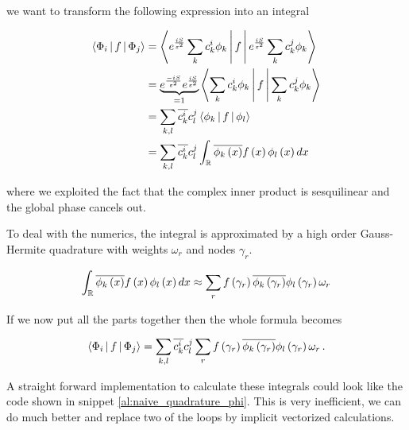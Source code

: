 we want to transform the following expression into an integral

\begin{equation} \label{eq:inner_product_single_family}
\begin{split}
  \Braket{ \Phi_i | f | \Phi_j } & = \Braket{e^\frac{iS}{\varepsilon^2} \sum_k c_k^i \phi_k | f | e^\frac{iS}{\varepsilon^2} \sum_k c_k^j \phi_k} \nonumber \\
                                 & = \underbrace{e^\frac{-iS}{\varepsilon^2} e^\frac{iS}{\varepsilon^2}}_{=1} \Braket{\sum_k c_k^i \phi_k | f | \sum_k c_k^j \phi_k} \nonumber \\
                                 & = \sum_{k,l} \overline{c_k^i} c_l^j \Braket{\phi_k | f | \phi_l} \nonumber \\
                                 & = \sum_{k,l} \overline{c_k^i} c_l^j \int_\mathbb{R} \overline{\phi_k\left( x \right)} f\left( x \right) \phi_l\left( x \right) dx
\end{split}
\end{equation}

where we exploited the fact that the complex inner product is sesquilinear and the global phase cancels out.

To deal with the numerics, the integral is approximated by a high order Gauss-Hermite quadrature with
weights $\omega_r$ and nodes $\gamma_r$.

\begin{equation} \label{eq:gauss_hermite_quadrature}
  \int_\mathbb{R} \overline{\phi_k\left( x \right)} f\left( x \right) \phi_l\left( x \right) dx \approx \sum_r f\left( \gamma_r \right) \overline{\phi_k\left( \gamma_r \right)} \phi_l\left( \gamma_r \right) \omega_r
\end{equation}

If we now put all the parts together then the whole formula becomes

\begin{equation} \label{eq:numerical_integral}
  \Braket{ \Phi_i | f | \Phi_j } = \sum_{k,l} \overline{c_k^i} c_l^j \sum_r f\left( \gamma_r \right) \overline{\phi_k\left( \gamma_r \right)} \phi_l\left( \gamma_r \right) \omega_r \,.
\end{equation}

A straight forward implementation to calculate these integrals could look like the code shown
in snippet \ref{al:naive_quadrature_phi}. This is very inefficient, we can do much
better and replace two of the loops by implicit vectorized calculations.

